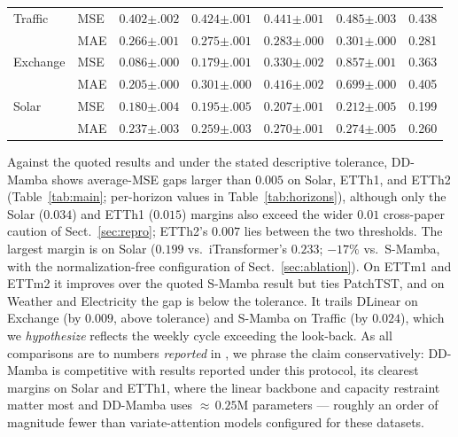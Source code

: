\documentclass[runningheads]{llncs}
\newcommand{\model}{DD-Mamba}
\begin{document}
\begin{table}[tb]
\begin{tabular}{@{}llccccc@{}}
Traffic & MSE & $0.402{\scriptstyle\pm.002}$ & $0.424{\scriptstyle\pm.001}$ & $0.441{\scriptstyle\pm.001}$ & $0.485{\scriptstyle\pm.003}$ & 0.438 \\
 & MAE & $0.266{\scriptstyle\pm.001}$ & $0.275{\scriptstyle\pm.001}$ & $0.283{\scriptstyle\pm.000}$ & $0.301{\scriptstyle\pm.000}$ & 0.281 \\
Exchange & MSE & $0.086{\scriptstyle\pm.000}$ & $0.179{\scriptstyle\pm.001}$ & $0.330{\scriptstyle\pm.002}$ & $0.857{\scriptstyle\pm.001}$ & 0.363 \\
 & MAE & $0.205{\scriptstyle\pm.000}$ & $0.301{\scriptstyle\pm.000}$ & $0.416{\scriptstyle\pm.002}$ & $0.699{\scriptstyle\pm.000}$ & 0.405 \\
Solar & MSE & $0.180{\scriptstyle\pm.004}$ & $0.195{\scriptstyle\pm.005}$ & $0.207{\scriptstyle\pm.001}$ & $0.212{\scriptstyle\pm.005}$ & 0.199 \\
 & MAE & $0.237{\scriptstyle\pm.003}$ & $0.259{\scriptstyle\pm.003}$ & $0.270{\scriptstyle\pm.001}$ & $0.274{\scriptstyle\pm.005}$ & 0.260 \\
\bottomrule
\end{tabular}
\end{table}

Against the quoted results and under the stated descriptive tolerance,
\model{} shows average-MSE gaps larger than $0.005$ on Solar, ETTh1, and ETTh2
(Table~\ref{tab:main}; per-horizon values in Table~\ref{tab:horizons}),
although only the Solar ($0.034$) and ETTh1 ($0.015$) margins also exceed the
wider $0.01$ cross-paper caution of Sect.~\ref{sec:repro}; ETTh2's $0.007$
lies between the two thresholds. The largest margin is on Solar ($0.199$
vs.\ iTransformer's $0.233$; $-17\%$ vs.\ S-Mamba, with the normalization-free
configuration of Sect.~\ref{sec:ablation}). On ETTm1 and ETTm2 it improves
over the quoted S-Mamba result but ties PatchTST, and on Weather and
Electricity the gap is below the tolerance. It trails DLinear on Exchange (by
$0.009$, above tolerance) and S-Mamba on Traffic (by $0.024$), which we
\emph{hypothesize} reflects the weekly cycle exceeding the look-back. As all
comparisons are to numbers \emph{reported} in \cite{smamba}, we phrase the
claim conservatively: \model{} is competitive with results reported under
this protocol, its clearest margins on Solar and ETTh1, where the linear
backbone and capacity restraint matter most and \model{} uses
$\approx\,0.25$M parameters --- roughly an order of magnitude fewer than
variate-attention models configured for these datasets.
\end{document}
